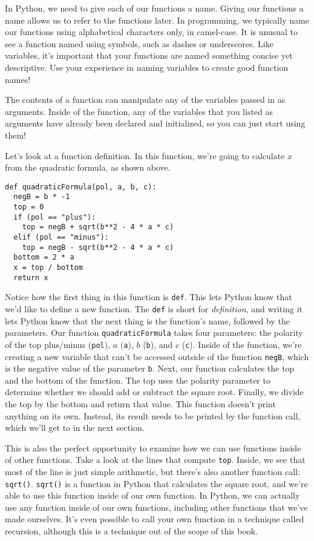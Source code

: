 In Python, we need to give each of our functions a name. Giving our functions a name allows us to refer to the functions later. In programming, we typically name our functions using alphabetical characters only, in camel-case. It is unusual to see a function named using symbols, such as dashes or underscores. Like variables, it's important that your functions are named something concise yet descriptive. Use your experience in naming variables to create good function names!\par
The contents of a function can manipulate any of the variables passed in as arguments. Inside of the function, any of the variables that you listed as arguments have already been declared and initialized, so you can just start using them!\par
Let's look at a function definition. In this function, we're going to calculate $x$ from the quadratic formula, as shown above.\par
\begin{lstlisting}[style=pippython]
def quadraticFormula(pol, a, b, c):
  negB = b * -1
  top = 0
  if (pol == "plus"):
    top = negB + sqrt(b**2 - 4 * a * c)
  elif (pol == "minus"):
    top = negB - sqrt(b**2 - 4 * a * c)
  bottom = 2 * a
  x = top / bottom
  return x
\end{lstlisting}
Notice how the first thing in this function is \verb|def|. This lets Python know that we'd like to define a new function. The \verb|def| is short for \textit{definition}, and writing it lets Python know that the next thing is the function's name, followed by the parameters. Our function \verb|quadraticFormula| takes four parameters: the polarity of the top plus/minus (\verb|pol|), $a$ (\verb|a|), $b$ (\verb|b|), and $c$ (\verb|c|). Inside of the function, we're creating a new variable that can't be accessed outside of the function \verb|negB|, which is the negative value of the parameter \verb|b|. Next, our function calculates the top and the bottom of the function. The top uses the polarity parameter to determine whether we should add or subtract the square root. Finally, we divide the top by the bottom and return that value. This function doesn't print anything on its own. Instead, its result needs to be printed by the function call, which we'll get to in the next section.\par
This is also the perfect opportunity to examine how we can use functions inside of other functions. Take a look at the lines that compute \verb|top|. Inside, we see that most of the line is just simple arithmetic, but there's also another function call: \verb|sqrt()|. \verb|sqrt()| is a function in Python that calculates the square root, and we're able to use this function inside of our own function. In Python, we can actually use any function inside of our own functions, including other functions that we've made ourselves. It's even possible to call your own function in a technique called recursion, although this is a technique out of the scope of this book.\par
